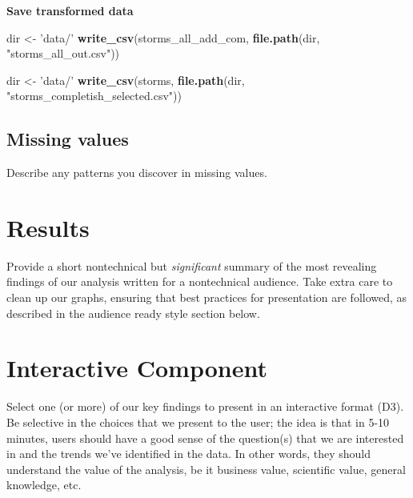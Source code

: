 \documentclass[]{book}
\newenvironment{Shaded}{\begin{snugshade}}{\end{snugshade}}
\newcommand{\KeywordTok}[1]{\textcolor[rgb]{0.13,0.29,0.53}{\textbf{#1}}}
\newcommand{\NormalTok}[1]{#1}
\newcommand{\StringTok}[1]{\textcolor[rgb]{0.31,0.60,0.02}{#1}}
\begin{document}
\textbf{Save transformed data}

\begin{Shaded}
\begin{Highlighting}[]
\NormalTok{dir <-}\StringTok{ 'data/'}
\KeywordTok{write_csv}\NormalTok{(storms_all_add_com, }\KeywordTok{file.path}\NormalTok{(dir, }\StringTok{"storms_all_out.csv"}\NormalTok{))}
\end{Highlighting}
\end{Shaded}

\begin{Shaded}
\begin{Highlighting}[]
\NormalTok{dir <-}\StringTok{ 'data/'}
\KeywordTok{write_csv}\NormalTok{(storms, }\KeywordTok{file.path}\NormalTok{(dir, }\StringTok{"storms_completish_selected.csv"}\NormalTok{))}
\end{Highlighting}
\end{Shaded}

\hypertarget{missing-values}{%
\section{Missing values}\label{missing-values}}

Describe any patterns you discover in missing values.

\hypertarget{results}{%
\chapter{Results}\label{results}}

Provide a short nontechnical but \emph{significant} summary of the most revealing findings of our analysis written for a nontechnical audience. Take extra care to clean up our graphs, ensuring that best practices for presentation are followed, as described in the audience ready style section below.

\hypertarget{interactive-component}{%
\chapter{Interactive Component}\label{interactive-component}}

Select one (or more) of our key findings to present in an interactive format (D3). Be selective in the choices that we present to the user; the idea is that in 5-10 minutes, users should have a good sense of the question(s) that we are interested in and the trends we've identified in the data. In other words, they should understand the value of the analysis, be it business value, scientific value, general knowledge, etc.
\end{document}

